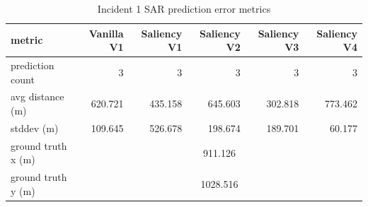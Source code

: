 \begin{table}[ht]
\centering
\caption{Incident 1 SAR prediction error metrics}
\label{tab:sar-incident-1}
\begin{tabular}{lrrrrr}
\hline
metric & Vanilla V1 & Saliency V1 & Saliency V2 & Saliency V3 & Saliency V4 \\
\hline
prediction count & 3 & 3 & 3 & 3 & 3 \\
avg distance (m) & 620.721 & 435.158 & 645.603 & 302.818 & 773.462 \\
stddev (m) & 109.645 & 526.678 & 198.674 & 189.701 & 60.177 \\
ground truth x (m) & \multicolumn{5}{c}{911.126} \\
ground truth y (m) & \multicolumn{5}{c}{1028.516} \\
\hline
\end{tabular}
\end{table}
